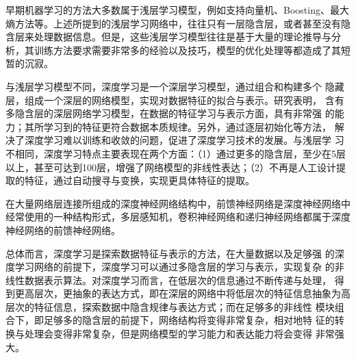 早期机器学习的方法大多数属于浅层学习模型，例如支持向量机\cite{cortes1995support}、Boosting\cite{schapire1990strength}、最大熵方法\cite{freedman2009statistical}等。上述所提到的浅层学习网络中，往往只有一层隐含层，或者甚至没有隐含层来处理数据信息。但是，这些浅层学习模型往往是基于大量的理论推导与分析，其训练方法要求需要非常多的经验以及技巧，模型的优化处理等都造成了其短暂的沉寂。 


与浅层学习模型不同，深度学习是一个深层学习模型，通过组合和构建多个 隐藏层，组成一个深层的网络模型，实现对数据特征的拟合与表示。研究表明\cite{hinton2006reducing}， 含有多隐含层的深层网络学习模型，在数据的特征学习与表示方面，具有非常强 的能力；其所学习到的特征更符合数据本质规律。另外，通过逐层初始化等方法， 解决了深度学习难以训练和收敛的问题，促进了深度学习技术的发展。与浅层学 习不相同，深度学习特点主要表现在两个方面：（1）通过更多的隐含层，至少在5层以上，甚至可达到100层，增强了网络模型的非线性表达；（2）不再是人工设计提取的特征，通过自动搜寻与变换，实现更具体特征的提取。 


在大量网络层连接所组成的深度神经网络结构中，前馈神经网络是深度神经网络中经常使用的一种结构形式，多层感知机\cite{hornik1989multilayer}，卷积神经网络\cite{lecun1998gradient}和递归神经网络\cite{mikolov2010recurrent}都属于深度神经网络的前馈神经网络\cite{孙志军2012深度学习研究综述}。

总体而言，深度学习是探索数据特征与表示的方法，在大量数据以及足够强 的深度学习网络的前提下，深度学习可以通过多隐含层的学习与表示，实现复杂 的非线性数据表示算法。对深度学习而言，在低层次的信息通过不断传递与处理， 得到更高层次，更抽象的表达方式，即在深层的网络中将低层次的特征信息抽象为高层次的特征信息，探索数据中隐含规律与表达方式；而在足够多的非线性 模块组合下，即足够多的隐含层的前提下，网络结构将变得非常复杂，相对地特 征的转换与处理会变得非常复杂，但是网络模型的学习能力和表达能力将会变得 非常强大。 


